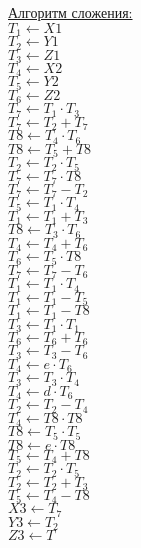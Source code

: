 \documentclass[a4paper,12pt]{article}
\begin{document}
	
	\underline{Алгоритм сложения:}\\
	    $T_1 \leftarrow X1$\\
	    $T_2 \leftarrow Y1$\\
	    $T_3 \leftarrow Z1$\\
	    $T_4 \leftarrow X2$\\
	    $T_5 \leftarrow Y2$\\
	    $T_6 \leftarrow Z2$\\
	    $ T_7 \leftarrow T_1 \cdot T_3$\\
		$T_7\leftarrow T_2+T_7$\\
		$T8 \leftarrow T_4 \cdot T_6$\\
		$T8\leftarrow T_5+T8$\\
		$T_2 \leftarrow T_2 \cdot T_5$\\
		$T_7 \leftarrow T_7 \cdot T8$\\
		$T_7\leftarrow T_7-T_2$\\
		$T_5 \leftarrow T_1 \cdot T_4$\\
		$T_1\leftarrow T_1+T_3$\\
		$T8 \leftarrow T_3 \cdot T_6$\\
		$T_4\leftarrow T_4+T_6$\\
		$T_6 \leftarrow T_5 \cdot T8$\\
		$T_7\leftarrow T_7-T_6$\\
		$T_1 \leftarrow T_1 \cdot T_4$\\
		$T_1\leftarrow T_1-T_5$\\
		$T_1\leftarrow T_1-T8$\\
		$T_3 \leftarrow T_1 \cdot T_1$\\
		$T_6\leftarrow T_6+T_6$\\
		$T_3\leftarrow T_3-T_6$\\
		$T_4 \leftarrow e\cdot T_6$\\
		$T_3 \leftarrow T_3 \cdot T_4$\\
		$T_4 \leftarrow d\cdot T_6$\\
		$T_2\leftarrow T_2-T_4$\\
		$T_4 \leftarrow T8 \cdot T8$\\
		$T8 \leftarrow T_5 \cdot T_5$\\
		$T8 \leftarrow e\cdot T8$\\
		$T_5\leftarrow T_4+T8$\\
		$T_2 \leftarrow T_2 \cdot T_5$\\
		$T_2\leftarrow T_2+T_3$\\
		$T_5\leftarrow T_4-T8$\\
		$X3 \leftarrow T_7$\\
		$Y3 \leftarrow T_2$\\
		$Z3 \leftarrow T$\\
	
\end{document}
